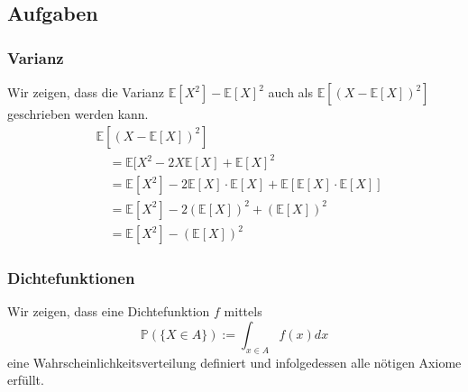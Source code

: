 \subsection{Aufgaben}
\subsubsection{Varianz}
Wir zeigen, dass die Varianz
 $\mathbb{E} [X^2] - \mathbb{E} [X]^2$ auch als $\mathbb{E} [(X- \mathbb{E} [X] )^2 ]$ geschrieben werden kann.	
\begin{align*}
&\mathbb{E} [(X- \mathbb{E} [X] )^2 ] \\
&\quad= \mathbb{E} [X^2 - 2X \mathbb{E} [X] + \mathbb{E} [X]^2 \\
&\quad= \mathbb{E} [X^2] - 2\mathbb{E} [X] \cdot \mathbb{E} [X] + \mathbb{E} [\mathbb{E} [X] \cdot \mathbb{E} [X]]\\

&\quad= \mathbb{E} [X^2] - 2(\mathbb{E} [X])^2 + (\mathbb{E} [X])^2\\
&\quad= \mathbb{E} [X^2] - (\mathbb{E} [X])^2
\end{align*}


\subsubsection{Dichtefunktionen}
Wir zeigen, dass eine Dichtefunktion $f$ mittels
\begin{equation*}
\mathbb{P}(\{X\in A\}):=\int_{x\in A}f(x)dx
\end{equation*}
eine Wahrscheinlichkeitsverteilung definiert und infolgedessen alle nötigen Axiome erfüllt.

